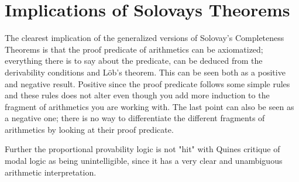 \documentclass[../main.tex]{subfiles}
\begin{document}
\section{Implications of Solovays Theorems}

The clearest implication of the generalized versions of Solovay's Completeness
Theorems is that the proof predicate of arithmetics can be axiomatized;
everything there is to say about the predicate, can be deduced from the
derivability conditions and Löb's theorem. This can be seen both as a positive
and negative result. Positive since the proof predicate follows some simple
rules and these rules  does not alter even though you add more induction to the
fragment of arithmetics you are working with. The last point can also be seen
as a negative one; there is no way to differentiate the different fragments of
arithmetics by looking at their proof predicate.

Further the proportional provability logic is not "hit" with Quines critique of
modal logic as being unintelligible, since it has a very clear and unambiguous
arithmetic interpretation.
\end{document}
